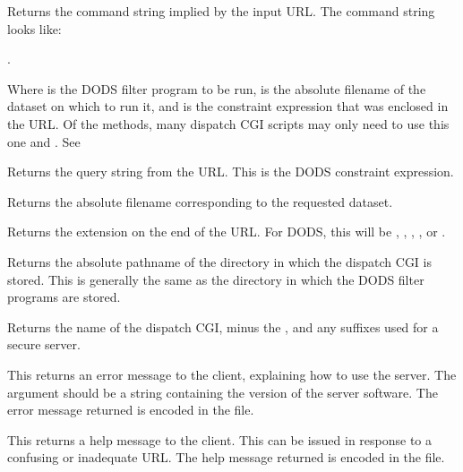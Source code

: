 \begin{description}
\item[\lit{command()}] Returns the command string implied by the input
  URL.  The command string looks like:

     .
  
  Where  is the DODS filter program to be run,
   is the absolute filename of the dataset on which to
  run it, and  is the constraint expression that was
  enclosed in the URL. Of the  methods, many
  dispatch CGI scripts may only need to use this one and
  .  See 
  
\item[\lit{query()}] Returns the query string from the URL.  This is
  the DODS constraint expression.
  
\item[\lit{filename()}] Returns the absolute filename corresponding to
  the requested dataset.
  
\item[\lit{extension()}] Returns the extension on the end of the URL.
  For DODS, this will be , , , ,
  or .
  
\item[\lit{cgi-dir()}] Returns the absolute pathname of the directory
  in which the dispatch CGI is stored.  This is generally the same as
  the directory in which the DODS filter programs are stored.
  
\item[\lit{script()}] Returns the name of the dispatch CGI, minus the
  , and any suffixes used for a secure server.

\item[\lit{print\_error\_message(}\var{ver}\lit{)}] This returns an error
  message to the client, explaining how to use the server.  The
   argument should be a string containing the version of the
  server software.  The error message returned is encoded in the
   file. 

\item[\lit{print\_help\_message()}] This returns a help message to the
  client.  This can be issued in response to a confusing or inadequate
  URL. The help message returned is encoded in the
   file. 
\end{description}

